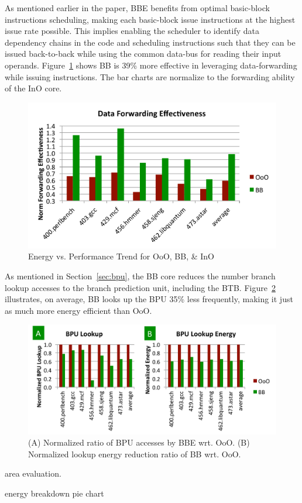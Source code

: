 As mentioned earlier in the paper, BBE benefits from optimal basic-block
instructions scheduling, making each basic-block issue instructions at the
highest issue rate possible. This implies enabling the scheduler to identify
data dependency chains in the code and scheduling instructions such that they
can be issued back-to-back while using the common data-bus for reading their
input operands. Figure~\ref{fig:forwarding} shows BB is 39\% more effective in
leveraging data-forwarding while issuing instructions. The bar charts are
normalize to the forwarding ability of the InO core. 
\begin{figure}[!htbp]
	\centering
	\includegraphics[width=1.0\columnwidth]{result/forwarding.pdf} 
    \caption{Energy vs. Performance Trend for OoO, BB, \& InO}
	\label{fig:forwarding}
\end{figure}

As mentioned in Section~\ref{sec:bpu}, the BB core reduces the number branch
lookup accesses to the branch prediction unit, including the BTB.
Figure~\ref{fig:bpu} illustrates, on average, BB looks up the BPU 35\% less
frequently, making it just as much more energy efficient than OoO.
\begin{figure}[!htbp]
	\centering
	\includegraphics[width=1.0\columnwidth]{result/bpu.pdf} 
    \caption{(A) Normalized ratio of BPU accesses by BBE wrt. OoO. (B)
        Normalized lookup energy reduction ratio of BB wrt. OoO.}
	\label{fig:bpu}
\end{figure}


area evaluation.

energy breakdown pie chart



